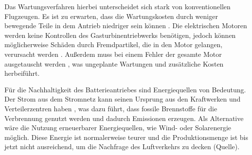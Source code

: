 



Das Wartungsverfahren hierbei unterscheidet sich stark von konventionellen Flugzeugen. 
Es ist zu erwarten, dass die Wartungskosten durch weniger bewegende Teile in dem Antrieb niedriger sein können \cite{dalmia2022powering}. 
%
Die elektrischen Motoren werden keine Kontrollen des Gasturbinentriebwerks benötigen, %
jedoch können möglicherweise Schäden durch Fremdpartikel, die in den Motor gelangen, verursacht werden \cite{reimers2018introduction}.
Außerdem muss bei einem Fehler der gesamte Motor ausgetauscht werden \cite{dalmia2022powering}, 
was ungeplante Wartungen und zusätzliche Kosten herbeiführt.

Für die Nachhaltigkeit des Batterieantriebes sind Energiequellen von Bedeutung. 
Der Strom aus dem Stromnetz kann seinen Ursprung aus 
den Kraftwerken und Verteilerzentren haben \cite{dalmia2022powering},
was dazu führt, dass fossile Brennstoffe für die Verbrennung genutzt 
werden und dadurch Emissionen erzeugen. 
Als Alternative wäre die Nutzung erneuerbarer Energiequellen, 
wie Wind- oder Solarenergie möglich. 
Diese Energie ist normalerweise teurer und die Produktionsmenge 
ist bis jetzt nicht ausreichend, um die Nachfrage des Luftverkehrs zu decken (Quelle).
